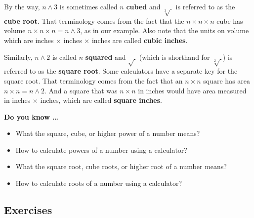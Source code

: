By the way, $n \land 3$ is sometimes called $n$ \textbf{cubed} and $\sqrt[3]{~}$ is referred to as the \textbf{cube root}.  That terminology comes from the fact that the $n \times n \times n$ cube has volume $n \times n \times n = n \land 3$, as in our example.  Also note that the units on volume which are inches $\times$ inches $\times$ inches are called \textbf{cubic inches}.

Similarly, $n \land 2$ is called $n$ \textbf{squared} and $\sqrt{~}$ (which is shorthand for $\sqrt[2]{~}$) is referred to as the \textbf{square root}.  Some calculators have a separate key for the square root.  That terminology comes from the fact that an $n \times n$ square has area $n \times n = n \land 2$.  And a square that was $n \times n$ in inches would have area measured in inches $\times$ inches, which are called \textbf{square inches}.
%

 

\noindent \textbf{Do you know \ldots}

\begin{itemize}
\item What the square, cube, or higher power of a number means? %
\item How to calculate powers of a number using a calculator? %
\item What the square root, cube roots, or higher root of a number means? %
\item How to calculate roots of a number using a calculator? %
  
\end{itemize}

\subsection*{Exercises}

